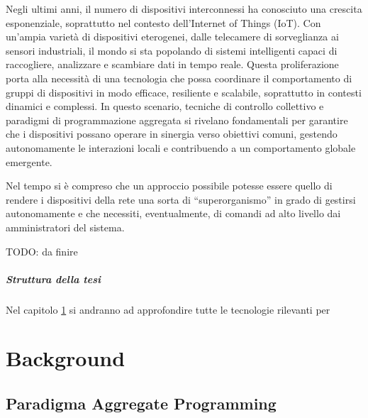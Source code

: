 \documentclass[12pt,a4paper,openright,twoside]{book}
\begin{document}
Negli ultimi anni, il numero di dispositivi interconnessi ha conosciuto una crescita esponenziale, soprattutto nel contesto dell'Internet of Things (IoT). Con un'ampia varietà di dispositivi eterogenei, dalle telecamere di sorveglianza ai sensori industriali, il mondo si sta popolando di sistemi intelligenti capaci di raccogliere, analizzare e scambiare dati in tempo reale. Questa proliferazione porta alla necessità di una tecnologia che possa coordinare il comportamento di gruppi di dispositivi in modo efficace, resiliente e scalabile, soprattutto in contesti dinamici e complessi. In questo scenario, tecniche di controllo collettivo e paradigmi di programmazione aggregata si rivelano fondamentali per garantire che i dispositivi possano operare in sinergia verso obiettivi comuni, gestendo autonomamente le interazioni locali e contribuendo a un comportamento globale emergente.

Nel tempo si è compreso che un approccio possibile potesse essere quello di rendere i dispositivi della rete una sorta di ``superorganismo'' in grado di gestirsi autonomamente e che necessiti, eventualmente, di comandi ad alto livello dai amministratori del sistema.

TODO: da finire

\paragraph{Struttura della tesi} Nel capitolo \cref{chap:background} si andranno ad approfondire tutte le tecnologie rilevanti per 

\chapter{Background}
\label{chap:background}



\section{Paradigma Aggregate Programming}
\end{document}
